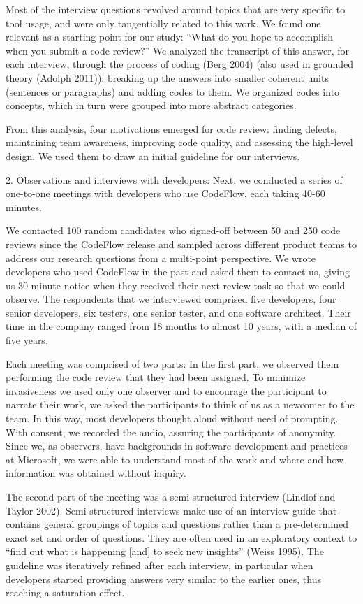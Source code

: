 Most of the interview questions revolved around topics that are very specific
to tool usage, and were only tangentially related to this work. We found one
relevant as a starting point for our study: ``What do you hope to accomplish
when you submit a code review?'' We analyzed the transcript of this answer, for
each interview, through the process of coding (Berg 2004) (also used in
grounded theory (Adolph 2011)): breaking up the answers into smaller coherent
units (sentences or paragraphs) and adding codes to them. We organized codes
into concepts, which in turn were grouped into more abstract categories.

From this analysis, four motivations emerged for code review: finding defects,
maintaining team awareness, improving code quality, and assessing the
high-level design. We used them to draw an initial guideline for our
interviews.

2. Observations and interviews with developers: Next, we conducted a series of
one-to-one meetings with developers who use CodeFlow, each taking 40-60
minutes. 

We contacted 100 random candidates who signed-off between 50 and 250 code
reviews since the CodeFlow release and sampled across different product teams
to address our research questions from a multi-point perspective. We wrote
developers who used CodeFlow in the past and asked them to contact us, giving
us 30 minute notice when they received their next review task so that we could
observe.  The respondents that we interviewed comprised five developers, four
senior developers, six testers, one senior tester, and one software architect.
Their time in the company ranged from 18 months to almost 10 years, with a
median of five years. 

Each meeting was comprised of two parts: In the first part, we observed them
performing the code review that they had been assigned. To minimize
invasiveness we used only one observer and to encourage the participant to
narrate their work, we asked the participants to think of us as a newcomer to
the team. In this way, most developers thought aloud without need of prompting.
With consent, we recorded the audio, assuring the participants of anonymity.
Since we, as observers, have backgrounds in software development and practices
at Microsoft, we were able to understand most of the work and where and how
information was obtained without inquiry. 

The second part of the meeting was a semi-structured interview (Lindlof and
Taylor 2002). Semi-structured interviews make use of an interview guide that
contains general groupings of topics and questions rather than a pre-determined
exact set and order of questions.  They are often used in an exploratory
context to ``find out what is happening [and] to seek new insights'' (Weiss
1995). The guideline was iteratively refined after each interview, in
particular when developers started providing answers very similar to the
earlier ones, thus reaching a saturation effect.

